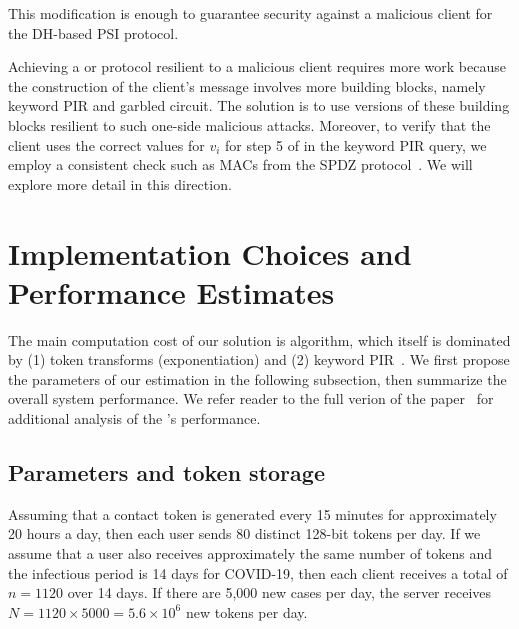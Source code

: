 {	This modification is enough to guarantee security against a malicious client for the DH-based PSI protocol. 
	
	Achieving a \psica or \tpsi protocol resilient to a malicious client requires more work because the construction of the client's message involves more building blocks, namely keyword PIR and garbled circuit. The solution is to use versions of these building blocks resilient to such one-side malicious attacks. Moreover, to verify that the client uses the correct values for $v_i$ for step 5 of  in the keyword PIR query, we employ a consistent check such as  MACs from the SPDZ protocol~\cite{C:DPSZ12}. We will explore more detail in this direction.  
	
}

\section{Implementation Choices and Performance Estimates}
\label{subs:perf}


The main computation cost of our solution is \psica algorithm, which itself is dominated by (1) token transforms (exponentiation) and (2) keyword PIR~\cite{SP:ACLS18, EPRINT:ALPRSSY19}. We first propose the parameters of our estimation in the following subsection, then  summarize the overall system performance. We refer reader  to the full verion of the paper~\cite{epione} for additional analysis of the \dect's performance.

\subsection{Parameters and token storage}
\label{subs:db-params}

Assuming that a contact token is generated every 15 minutes for approximately 20 hours a day, then each user sends 80 distinct 128-bit tokens per day. If we assume that a user also receives approximately the same number of tokens and the infectious period is 14 days for COVID-19, then each client receives a total of $n=1120$ over 14 days. If there are 5,000 new cases per day, the server receives $N = 1120 \times 5000 = 5.6 \times 10^6$ new tokens per day.

